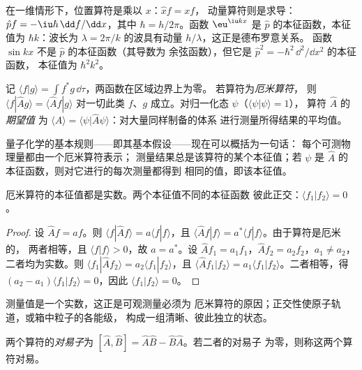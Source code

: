 \begin{example}[位置与动量的两个算符]\label{ex:b3:quantum-model-systems:xp}
在一维情形下，位置算符是乘以 $x$：$\hat x f = xf$，
动量算符则是求导：$\hat p f = -\iu\hbar\,
\dd f/\dd x$，其中 $\hbar = h/2\pi$。函数 $\eu^{\iu kx}$ 是
$\hat p$ 的本征函数，本征值为 $\hbar k$：波长为
$\lambda = 2\pi/k$ 的波具有动量 $h/\lambda$，这正是德布罗意关系。
函数 $\sin kx$ 不是 $\hat p$ 的本征函数（其导数为
余弦函数），但它是 $\hat p^2 = -\hbar^2\,\dd^2/\dd x^2$ 的本征函数，
本征值为 $\hbar^2k^2$。
\end{example}

\begin{definition}\label{def:b3:quantum-model-systems:hermitian}
记 $\langle f|g\rangle = \int f^*g\,\dd\tau$，两函数在区域边界上为零。
若算符为\emph{厄米算符}，
则 $\langle f|\hat Ag\rangle = \langle \hat Af|g\rangle$ 对一切此类
$f$、$g$ 成立。对归一化态 $\psi$（$\langle\psi|\psi\rangle = 1$），
算符 $\hat A$ 的\emph{期望值}
为 $\langle A\rangle = \langle\psi|\hat A\psi\rangle$：对大量同样制备的体系
进行测量所得结果的平均值。
\end{definition}

量子化学的基本规则——即其基本假设——现在可以概括为一句话：
每个可测物理量都由一个厄米算符表示；
测量结果总是该算符的某个本征值；若
$\psi$ 是 $\hat A$ 的本征函数，则对它进行的每次测量都得到
相同的值，即该本征值。

\begin{theorem}[厄米算符]\label{thm:b3:quantum-model-systems:hermitian-real}
厄米算符的本征值都是实数。两个本征值不同的本征函数
彼此正交：$\langle f_1|f_2\rangle = 0$。
\end{theorem}

\begin{proof}
设 $\hat Af = af$。则 $\langle f|\hat Af\rangle = a\langle f|f\rangle$，且
$\langle\hat Af|f\rangle = a^*\langle f|f\rangle$。由于算符是厄米的，
两者相等，且 $\langle f|f\rangle > 0$，故 $a = a^*$。设 $\hat Af_1
= a_1f_1$，$\hat Af_2 = a_2f_2$，$a_1 \ne a_2$，二者均为实数。则
$\langle f_1|\hat Af_2\rangle = a_2\langle f_1|f_2\rangle$，且 $\langle\hat Af_1|
f_2\rangle = a_1\langle f_1|f_2\rangle$。二者相等，得 $(a_2 - a_1)
\langle f_1|f_2\rangle = 0$，因此 $\langle f_1|f_2\rangle = 0$。
\end{proof}

测量值是一个实数，这正是可观测量必须为
厄米算符的原因；正交性使原子轨道，或箱中粒子的各能级，
构成一组清晰、彼此独立的状态。

\begin{definition}[对易子]\label{def:b3:quantum-model-systems:commutator}
两个算符的\emph{对易子}为 $[\hat A,\hat B] =
\hat A\hat B - \hat B\hat A$。若二者的对易子
为零，则称这两个算符对易。
\end{definition}

